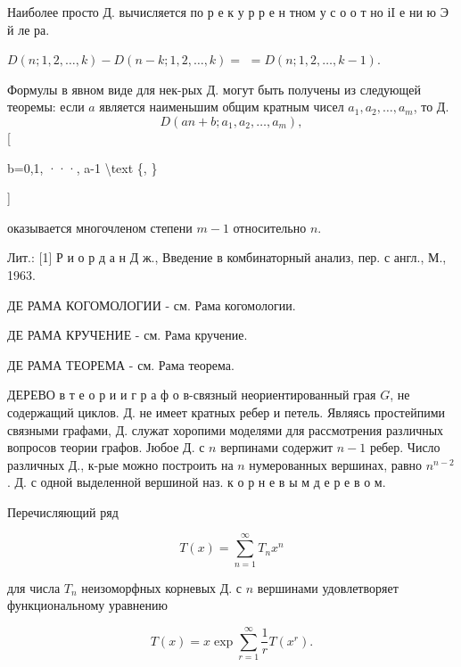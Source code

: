 \documentclass[10pt]{article}
\begin{document}
Наиболее просто Д. вычисляется по р е к у р р е н тном у с о о т но іI е ни ю Э й ле ра.



$D(n ; 1,2, \ldots, k)-D(n-k ; 1,2, \ldots, k)=$ $=D(n ; 1,2, \ldots, k-1)$.



Формулы в явном виде для нек-рых Д. могут быть получены из следующей теоремы: если $a$ является наименьшим общим кратным чисел $a_{1}, a_{2}, \ldots, a_{m}$, то Д.\[

D\left(a n+b ; a_{1}, a_{2}, \ldots, a_{m}\right),

\][



b=0,1, ···, a-1 \textbackslash text \{, \}

]



оказывается многочленом степени $m-1$ относительно $n$.



Лит.: [1] Р и о р д а н Д ж., Введение в комбинаторный анализ, пер. с англ., М., 1963.



ДЕ РАМА КОГОМОЛОГИИ - см. Рама когомологии.



ДЕ РАМА КРУЧЕНИЕ - см. Рама кручение.



ДЕ РАМА ТЕОРЕМА - см. Рама теорема.



ДЕРЕВО в т е о р и и $г$ р а ф о в-связный неориентированный грая $G$, не содержащий циклов. Д. не имеет кратных ребер и петель. Являясь простейпими связными графами, Д. служат хоропими моделями для рассмотрения различных вопросов теории графов. Јюбое Д. с $n$ верпинами содержит $n-1$ ребер. Число различных Д., к-рые можно построить на $n$ нумерованных вершинах, равно $n^{n-2}$. Д. с одной выделенной вершиной наз. к о р н е в ы м д е р е в о м.



Перечисляющий ряд



\[

T(x)=\sum_{n=1}^{\infty} T_{n} x^{n}

\]



для числа $T_{n}$ неизоморфных корневых Д. с $n$ вершинами удовлетворяет функциональному уравнению



\[

T(x)=x \exp \sum_{r=1}^{\infty} \frac{1}{r} T\left(x^{r}\right) .

\]
\end{document}
